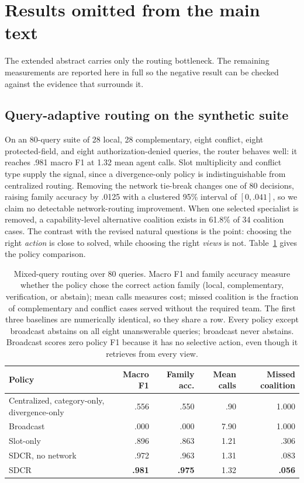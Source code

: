 \section{Results omitted from the main text}
The extended abstract carries only the routing bottleneck. The remaining
measurements are reported here in full so the negative result can be checked
against the evidence that surrounds it.

\subsection{Query-adaptive routing on the synthetic suite}
On an 80-query suite of 28 local, 28 complementary, eight conflict, eight
protected-field, and eight authorization-denied queries, the router behaves well:
it reaches .981 macro F1 at 1.32 mean agent calls. Slot multiplicity and conflict
type supply the signal, since a divergence-only policy is indistinguishable from
centralized routing. Removing the network tie-break changes one of 80 decisions,
raising family accuracy by .0125 with a clustered 95\% interval of $[0,.041]$, so
we claim no detectable network-routing improvement. When one selected specialist
is removed, a capability-level alternative coalition exists in 61.8\% of 34
coalition cases. The contrast with the revised natural questions is the point:
choosing the right \emph{action} is close to solved, while choosing the right
\emph{views} is not. Table~\ref{tab:routing-ea} gives the policy comparison.

\begin{table}[t]
\centering
\caption{Mixed-query routing over 80 queries. Macro F1 and family accuracy measure whether the policy chose the correct action family (local, complementary, verification, or abstain); mean calls measures cost; missed coalition is the fraction of complementary and conflict cases served without the required team. The first three baselines are numerically identical, so they share a row. Every policy except broadcast abstains on all eight unanswerable queries; broadcast never abstains. Broadcast scores zero policy F1 because it has no selective action, even though it retrieves from every view.}
\label{tab:routing-ea}
\small
\begin{tabular}{lrrrr}
\toprule
Policy & Macro F1 & Family acc. & Mean calls & Missed coalition\\
\midrule
Centralized, category-only, divergence-only & .556 & .550 & .90 & 1.000\\
Broadcast & .000 & .000 & 7.90 & 1.000\\
Slot-only & .896 & .863 & 1.21 & .306\\
SDCR, no network & .972 & .963 & 1.31 & .083\\
SDCR & \textbf{.981} & \textbf{.975} & 1.32 & \textbf{.056}\\
\bottomrule
\end{tabular}
\end{table}

